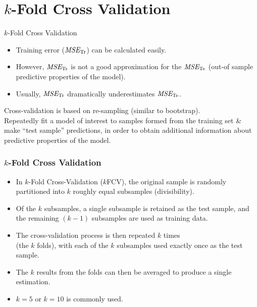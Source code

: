 \documentclass{beamer}
\begin{document}
\section{$k$-Fold Cross Validation}
\begin{frame}{$k$-Fold Cross Validation}
\begin{itemize}
\item Training error ($\textit{MSE}_{\textnormal{Tr}}$) can be calculated easily. 
\item However, $\textit{MSE}_{\textnormal{Tr}}$ is not a good approximation for the $\textit{MSE}_{\textnormal{Te}}$ (out-of sample predictive properties of the model).
\item Usually, $\textit{MSE}_{\textnormal{Tr}}$ dramatically underestimates $\textit{MSE}_{\textnormal{Te}}$.
\end{itemize}
\bigskip
Cross-validation is based on re-sampling (similar to bootstrap).\\
\medskip
Repeatedly fit a model of interest to samples formed from the training set \& make ``test sample'' predictions, in order to obtain additional information about predictive properties of the model.\\
\end{frame}
\begin{frame}
\frametitle{$k$-Fold Cross Validation}

\begin{itemize}
  \item In $k$-Fold Cross-Validation ($k$FCV), the original sample is randomly partitioned into $k$ roughly equal subsamples (divisibility). 
  \smallskip
  \item Of the $k$ subsamples, a single subsample is retained as the test sample, and the remaining $(k-1)$ subsamples are used as training data. 
  \smallskip
  \item The cross-validation process is then repeated $k$ times \\(the $k$ folds), with each of the $k$ subsamples used exactly once as the test sample. 
  \smallskip
  \item The $k$ results from the folds can then be averaged to produce a single estimation. 
  \smallskip
  \item $k = 5$ or $k=10$ is commonly used.
\end{itemize}  
\end{frame}
\end{document}
